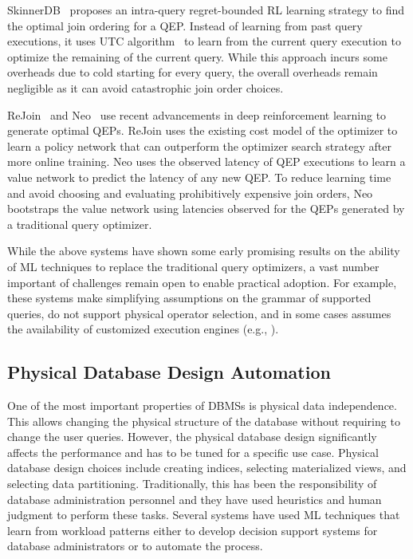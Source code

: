 SkinnerDB~\cite{skinnerdb} proposes an intra-query regret-bounded RL learning strategy to find the optimal join ordering for a QEP.
Instead of learning from past query executions, it uses UTC algorithm~\cite{utc} to learn from the current query execution to optimize the remaining of the current query.
While this approach incurs some overheads due to cold starting for every query, the overall overheads remain negligible as it can avoid catastrophic join order choices.

ReJoin~\cite{rejoin} and Neo~\cite{neo} use recent advancements in deep reinforcement learning to generate optimal QEPs.
ReJoin uses the existing cost model of the optimizer to learn a policy network that can outperform the optimizer search strategy after more online training.
Neo uses the observed latency of QEP executions to learn a value network to predict the latency of any new QEP.
To reduce learning time and avoid choosing and evaluating prohibitively expensive join orders, Neo bootstraps the value network using latencies observed for the QEPs generated by a traditional query optimizer.

While the above systems have shown some early promising results on the ability of ML techniques to replace the traditional query optimizers, a vast number important of challenges remain open to enable practical adoption.
For example, these systems make simplifying assumptions on the grammar of supported queries, do not support physical operator selection, and in some cases assumes the availability of customized execution engines (e.g., \cite{skinnerdb}).


\subsection{Physical Database Design Automation}
One of the most important properties of  DBMSs is physical data independence.
This allows changing the physical structure of the database without requiring to change the user queries.
However, the physical database design significantly affects the performance and has to be tuned for a specific use case.
Physical database design choices include creating indices, selecting materialized views, and selecting data partitioning.
Traditionally, this has been the responsibility of database administration personnel and they have used heuristics and human judgment to perform these tasks.
Several systems have used ML techniques that learn from workload patterns either to develop decision support systems for database administrators or to automate the process.


